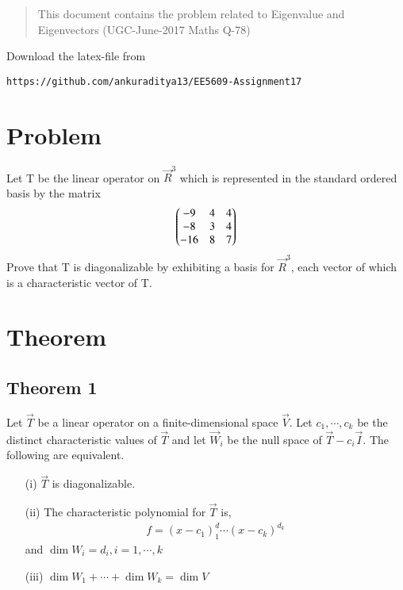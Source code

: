 \documentclass[journal,12pt,twocolumn]{IEEEtran}
\begin{document}
\begin{abstract}
This document contains the problem related to Eigenvalue and Eigenvectors (UGC-June-2017 Maths Q-78) 
\end{abstract}
Download the latex-file from 
\begin{lstlisting}
https://github.com/ankuraditya13/EE5609-Assignment17
\end{lstlisting}

\section{Problem}
Let T be the linear operator on $\vec{R}^3$ which is represented in the standard ordered basis by the matrix
\begin{align}
\begin{pmatrix}-9&4&4\\-8&3&4\\-16&8&7\end{pmatrix}
\label{Q}
\end{align}
Prove that T is diagonalizable by exhibiting a basis for $\vec{R}^3$, each vector of which is a characteristic vector of T. 
\section{Theorem}
\subsection{\textbf{Theorem 1}}
Let $\vec{T}$ be a linear operator on a finite-dimensional space $\vec{V}$. Let $c_1, \cdots, c_k$ be the distinct characteristic values of $\vec{T}$ and let $\vec{W}_i$ be the null space of $\vec{T}-c_i\vec{I}$. The following are equivalent.
\begin{enumerate}
\item[(i)] $\vec{T}$ is diagonalizable.
\item[(ii)] The characteristic polynomial for $\vec{T}$ is,
\begin{align}
f = (x-c_1)^d_1 \cdots (x - c_k)^{d_k}
\end{align}
and $\dim W_i = d_i, i=1,\cdots ,k$
\item[(iii)] $\dim W_1+\cdots+\dim W_k = \dim V$ 
\end{enumerate}  
\end{document}
